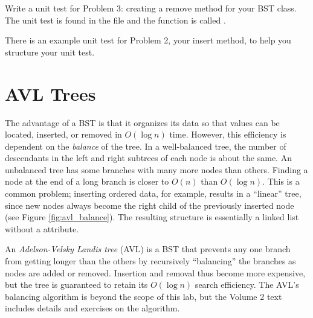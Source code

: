 \begin{unittest}
Write a unit test for Problem 3: creating a remove method for your BST class. The unit test is found in the file  and the function is called .

\noindent There is an example unit test for Problem 2, your insert method, to help you structure your unit test.
\end{unittest}

\section*{AVL Trees} %

The advantage of a BST is that it organizes its data so that values can be located, inserted, or removed in $O(\log{n})$ time.
However, this efficiency is dependent on the \emph{balance} of the tree.
In a well-balanced tree, the number of descendants in the left and right subtrees of each node is about the same.
An unbalanced tree has some branches with many more nodes than others.
Finding a node at the end of a long branch is closer to $O(n)$ than $O(\log{n})$.
This is a common problem; inserting ordered data, for example, results in a ``linear'' tree, since new nodes always become the right child of the previously inserted node (see Figure \ref{fig:avl_balance}).
The resulting structure is essentially a linked list without a  attribute.

\begin{comment}
\begin{lstlisting}
# Sequentially adding ordered data destroys the efficiency of a BST.
>>> unbalanced_tree = BST()
>>> for i in range(10):
...     unbalanced_tree.insert(i)
...
# The tree is perfectly flat, so it loses its search efficiency.
>>> print(unbalanced_tree)
[0]
[1]
[2]
[3]
[4]
[5]
[6]
[7]
[8]
[9]

>>> balanced_tree = AVL()
>>> for i in range(10):
...     balanced_tree.insert(i)
...
# The AVL tree is balanced, so it retains its search efficiency.
>>> print(balanced_tree)
[3]
[1, 7]
[0, 2, 5, 8]
[4, 6, 9]
\end{lstlisting}
\end{comment}

An \emph{Adelson-Velsky Landis tree} (AVL) is a BST that prevents any one branch from getting longer than the others by recursively ``balancing'' the branches as nodes are added or removed.
Insertion and removal thus become more expensive, but the tree is guaranteed to retain its $O(\log{n})$ search efficiency.
The AVL's balancing algorithm is beyond the scope of this lab, but the Volume 2 text includes details and exercises on the algorithm.

